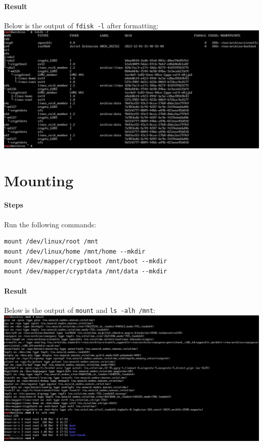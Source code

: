 \documentclass[12pt, a4paper]{article}
\begin{document}
  \paragraph{Result}
  Below is the output of \verb|fdisk -l| after formatting:\\[1.5ex]
  \includegraphics[width=\textwidth]{5_result.png}

  \section{Mounting}
  \paragraph{Steps}
  Run the following commands:
    \begin{verbatim}
mount /dev/linux/root /mnt
mount /dev/linux/home /mnt/home --mkdir
mount /dev/mapper/cryptboot /mnt/boot --mkdir
mount /dev/mapper/cryptdata /mnt/data --mkdir\end{verbatim}
  \paragraph{Result}
  Below is the output of \verb|mount| and \verb|ls -alh /mnt|:\\[1.5ex]
  \includegraphics[width=\textwidth]{6_result.png}
\end{document}
